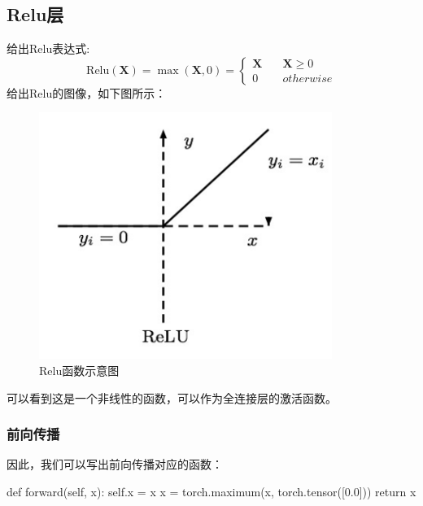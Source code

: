\documentclass[12pt,a4paper]{ctexart}
\numberwithin{equation}{section}%
\numberwithin{figure}{section}%
\begin{document}
\subsection{Relu层}
给出$\mathrm{Relu}$表达式:
\begin{equation}
\mathrm{Relu}(\boldsymbol{X})=\max(\boldsymbol{X},0)
=\left \{ 
\begin{aligned}
\boldsymbol{X} \quad &\boldsymbol{X} \geq 0 \\
0 \quad &otherwise
\end{aligned}
    \right
    .
\label{relu}
\end{equation}
给出Relu的图像，如下图所示：
\begin{figure}[!h] %
    \centering %
    \includegraphics[scale=0.7]{relu.png} %
    \caption{$\mathrm{Relu}$函数示意图}
    \label{fig} %
    \end{figure}

\noindent 可以看到这是一个非线性的函数，可以作为全连接层的激活函数。
\subsubsection{前向传播}
因此，我们可以写出前向传播对应的函数：
\begin{python}
def forward(self, x):
    self.x = x
    x = torch.maximum(x, torch.tensor([0.0]))
    return x
\end{python}
\end{document}
